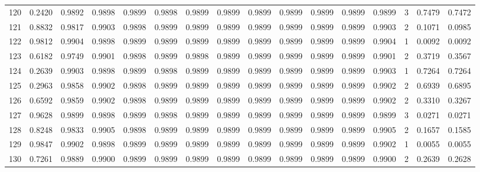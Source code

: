 \begin{tabular}{lrrrrrrrrrrrrrrr}
120 &      0.2420 &  0.9892 &  0.9898 &  0.9899 &  0.9898 &  0.9899 &  0.9899 &  0.9899 &  0.9899 &  0.9899 &   0.9899 &     0.9899 &      3 &                    0.7479 &                     0.7472 \\
121 &      0.8832 &  0.9817 &  0.9903 &  0.9898 &  0.9899 &  0.9899 &  0.9899 &  0.9899 &  0.9899 &  0.9899 &   0.9899 &     0.9903 &      2 &                    0.1071 &                     0.0985 \\
122 &      0.9812 &  0.9904 &  0.9898 &  0.9899 &  0.9899 &  0.9899 &  0.9899 &  0.9899 &  0.9899 &  0.9899 &   0.9899 &     0.9904 &      1 &                    0.0092 &                     0.0092 \\
123 &      0.6182 &  0.9749 &  0.9901 &  0.9898 &  0.9899 &  0.9898 &  0.9899 &  0.9899 &  0.9899 &  0.9899 &   0.9899 &     0.9901 &      2 &                    0.3719 &                     0.3567 \\
124 &      0.2639 &  0.9903 &  0.9898 &  0.9899 &  0.9898 &  0.9899 &  0.9899 &  0.9899 &  0.9899 &  0.9899 &   0.9899 &     0.9903 &      1 &                    0.7264 &                     0.7264 \\
125 &      0.2963 &  0.9858 &  0.9902 &  0.9898 &  0.9899 &  0.9899 &  0.9899 &  0.9899 &  0.9899 &  0.9899 &   0.9899 &     0.9902 &      2 &                    0.6939 &                     0.6895 \\
126 &      0.6592 &  0.9859 &  0.9902 &  0.9898 &  0.9899 &  0.9899 &  0.9899 &  0.9899 &  0.9899 &  0.9899 &   0.9899 &     0.9902 &      2 &                    0.3310 &                     0.3267 \\
127 &      0.9628 &  0.9899 &  0.9898 &  0.9899 &  0.9898 &  0.9899 &  0.9899 &  0.9899 &  0.9899 &  0.9899 &   0.9899 &     0.9899 &      3 &                    0.0271 &                     0.0271 \\
128 &      0.8248 &  0.9833 &  0.9905 &  0.9898 &  0.9899 &  0.9899 &  0.9899 &  0.9899 &  0.9899 &  0.9899 &   0.9899 &     0.9905 &      2 &                    0.1657 &                     0.1585 \\
129 &      0.9847 &  0.9902 &  0.9898 &  0.9899 &  0.9899 &  0.9899 &  0.9899 &  0.9899 &  0.9899 &  0.9899 &   0.9899 &     0.9902 &      1 &                    0.0055 &                     0.0055 \\
130 &      0.7261 &  0.9889 &  0.9900 &  0.9899 &  0.9899 &  0.9899 &  0.9899 &  0.9899 &  0.9899 &  0.9899 &   0.9899 &     0.9900 &      2 &                    0.2639 &                     0.2628 \\

\end{tabular}
